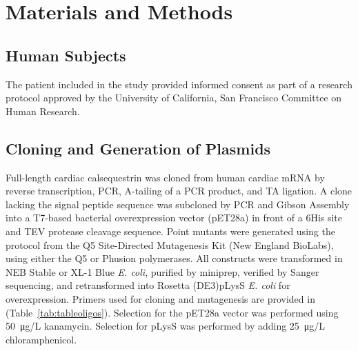 %
%
\section{Materials and Methods}

\subsection*{Human Subjects}
The patient included in the study provided informed consent as part of a research protocol approved by the University of California, San Francisco Committee on Human Research.

\subsection*{Cloning and Generation of Plasmids}
Full-length cardiac calsequestrin was cloned from human cardiac mRNA by reverse transcription, PCR, A-tailing of a PCR product, and TA ligation. A clone lacking the signal peptide sequence was subcloned by PCR and Gibson Assembly into a T7-based bacterial overexpression vector (pET28a) in front of a 6His site and TEV protease cleavage sequence. Point mutants were generated using the protocol from the Q5 Site-Directed Mutagenesis Kit (New England BioLabs), using either the Q5 or Phusion polymerases. All constructs were transformed in NEB Stable or XL-1 Blue \textit{E. coli}, purified by miniprep, verified by Sanger sequencing, and retransformed into Rosetta (DE3)pLysS \textit{E. coli} for overexpression. Primers used for cloning and mutagenesis are provided in (Table~\ref{tab:tableoligos}). Selection for the pET28a vector was performed using \SI{50}{\micro\gram/\liter} kanamycin. Selection for pLysS was performed by adding \SI{25}{\micro\gram/\liter} chloramphenicol.

